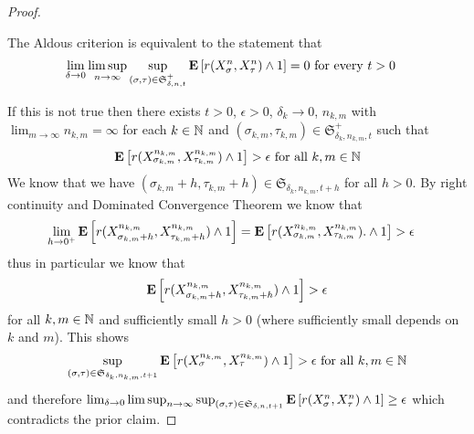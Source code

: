 \begin{proof}
\begin{clm}The Aldous criterion is equivalent to the statement that
\begin{align*}
\lim_{\delta \to 0} \limsup_{n \to \infty} \sup_{(\sigma, \tau) \in
  \mathfrak{S}^+_{\delta,n,t}} \textbf{E}\left[r(X^n_\sigma, X^n_\tau) \wedge
  1\right] &= 0 \text{ for every $t > 0$}
\end{align*}
\end{clm}
If this is not true then there exists $t > 0$, $\epsilon>0$,  $\delta_k \to 0$, $n_{k,m}$ with $\lim_{m \to \infty} n_{k,m} = \infty$ for each $k \in \mathbb{N}$ and $(\sigma_{k,m}, \tau_{k,m}) \in \mathfrak{S}^+_{\delta_k,n_{k,m},t}$ such that
\begin{align*}
\textbf{E}\left[r(X^{n_{k,m}}_{\sigma_{k,m}}, X^{n_{k,m}}_{\tau_{k,m}}) \wedge  1\right]  > \epsilon \text{ for all $k, m \in \mathbb{N}$}
\end{align*}
We know that we have $(\sigma_{k,m}+h, \tau_{k,m}+h) \in  \mathfrak{S}_{\delta_k,n_{k,m},t+h}$ for all $h > 0$.  By right continuity and Dominated Convergence Theorem we know that 
\begin{align*}
\lim_{h \to 0^+} \textbf{E}\left[r(X^{n_{k,m}}_{\sigma_{k,m}+h}, X^{n_{k,m}}_{\tau_{k,m}+h}) \wedge  1\right] &= \textbf{E}\left[r(X^{n_{k,m}}_{\sigma_{k,m}}, X^{n_{k,m}}_{\tau_{k,m}}). \wedge  1\right] > \epsilon
\end{align*}
thus in particular we know that 
\begin{align*}
\textbf{E}\left[r(X^{n_{k,m}}_{\sigma_{k,m}+h}, X^{n_{k,m}}_{\tau_{k,m}+h}) \wedge  1\right] > \epsilon
\end{align*}
for all $k,m \in \mathbb{N}$  and sufficiently small $h>0$ (where sufficiently small depends on $k$ and $m$).  This shows 
\begin{align*}
 \sup_{(\sigma, \tau) \in  \mathfrak{S}_{\delta_k,n_{k,m},t+1}}\textbf{E}\left[r(X^{n_{k,m}}_{\sigma}, X^{n_{k,m}}_{\tau}) \wedge  1\right] > \epsilon \text{ for all $k,m \in \mathbb{N}$}
\end{align*}
and therefore $\lim_{\delta \to 0} \limsup_{n \to \infty} \sup_{(\sigma, \tau) \in  \mathfrak{S}_{\delta,n,t+1}} \textbf{E}\left[r(X^n_\sigma, X^n_\tau) \wedge 1\right] \geq \epsilon$ which contradicts the prior claim.


\end{proof}
